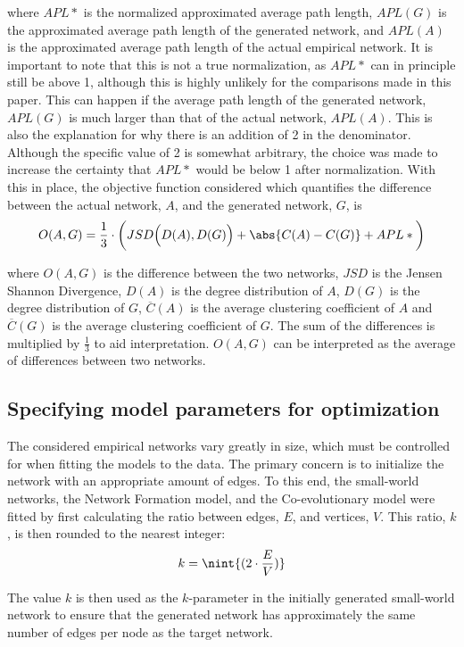 \documentclass[11pt]{article}
\DeclarePairedDelimiter{\nint}\lfloor\rceil
\DeclarePairedDelimiter{\abs}\lvert\rvert
\begin{document}
where $APL*$ is the normalized approximated average path length, $APL(G)$ is the approximated average path length of the generated network, and $APL(A)$ is the approximated average path length of the actual empirical network. It is important to note that this is not a true normalization, as $APL*$ can in principle still be above 1, although this is highly unlikely for the comparisons made in this paper. This can happen if the average path length of the generated network, $APL(G)$ is much larger than that of the actual network, $APL(A)$. This is also the explanation for why there is an addition of 2 in the denominator. Although the specific value of 2 is somewhat arbitrary, the choice was made to increase the certainty that $APL*$ would be below 1 after normalization.
With this in place, the objective function considered which quantifies the difference between the actual network, $A$, and the generated network, $G$, is 
$$ O(A, G) = \frac{1}{3} \cdot \bigg(JSD \Big(D(A), D(G) \Big) + \abs{C(A) - C(G)} + APL*\bigg)$$

where $O(A, G)$ is the difference between the two networks, $JSD$ is the Jensen Shannon Divergence, $D(A)$ is the degree distribution of $A$, $D(G)$ is the degree distribution of $G$, $\overline{C}(A)$ is the average clustering coefficient of $A$ and $\overline{C}(G)$ is the average clustering coefficient of $G$. The sum of the differences is multiplied by $\frac{1}{3}$ to aid interpretation. $O(A,G)$ can be interpreted as the average of differences between two networks.

\subsection{Specifying model parameters for optimization}
The considered empirical networks vary greatly in size, which must be controlled for when fitting the models to the data. The primary concern is to initialize the network with an appropriate amount of edges. To this end, the small-world networks, the Network Formation model, and the Co-evolutionary model were fitted by first calculating the ratio between edges, $E$, and vertices, $V$. This ratio, $k$, is then rounded to the nearest integer: 
$$k = \nint{(2 \cdot \frac{E}{V})}$$

The value $k$ is then used as the $k$-parameter in the initially generated small-world network to ensure that the generated network has approximately the same number of edges per node as the target network. 
\end{document}

